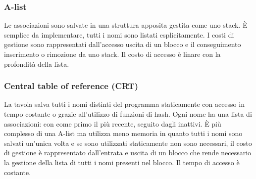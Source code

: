 \subsubsection{A-list}
Le associazioni sono salvate in una struttura apposita gestita come uno stack. \`E semplice da implementare, tutti i nomi sono listati esplicitamente. I costi di gestione sono
rappresentati dall'accesso uscita di un blocco e il conseguimento inserimento o rimozione da uno stack. Il costo di accesso \`e linare con la profondit\`a della lista.
\subsubsection{Central table of reference (CRT)}
La tavola salva tutti i nomi distinti del programma staticamente con accesso in tempo costante o grazie all'utilizzo di funzioni di hash. Ogni nome ha una lista di 
associazioni: con come primo il pi\`u recente, seguito dagli inattivi. \`E pi\`u complesso di una A-list ma utilizza meno memoria in quanto tutti i nomi sono salvati un'unica
volta e se sono utilizzati staticamente non sono necessari, il costo di gestione \`e rappresentato dall'entrata e uscita di un blocco che rende necessario la gestione della 
lista di tutti i nomi presenti nel blocco. Il tempo di accesso \`e costante. 